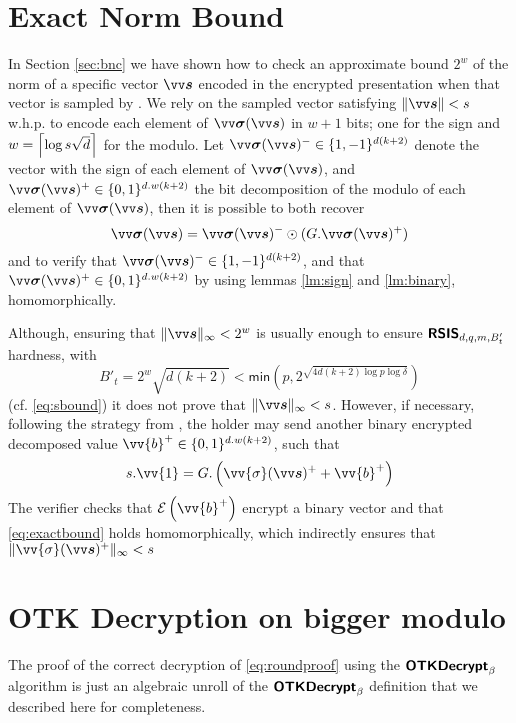 \section{Exact Norm Bound}\label{app:enb}

In Section \ref{sec:bnc} we have shown how to check an approximate bound $2^w$ of the norm of a specific vector $\pv{s}$ encoded in the encrypted presentation when that vector is sampled by . We rely on the sampled vector satisfying $\|\pv{s}\|<s$ w.h.p. to encode each element of $\pv{\sigma}(\pv{s})$ in $w+1$ bits; one for the sign and $w=\left\lceil \log s\sqrt{d} \right\rceil$ for the modulo. Let $\pv{\sigma}(\pv{s})^{-} \in \{1,-1\}^{d(k+2)}$ denote the vector with the sign of each element of $\pv{\sigma}(\pv{s})$, and $\pv{\sigma}(\pv{s})^{+} \in \{0,1\}^{d.w(k+2)}$ the bit decomposition of the modulo of each element of $\pv{\sigma}(\pv{s})$, then it is possible to both recover \[\pv{\sigma}(\pv{s}) = \pv{\sigma}(\pv{s})^{-} \odot (G.\pv{\sigma}(\pv{s})^{+})\]
and to verify that $\pv{\sigma}(\pv{s})^{-} \in \{1,-1\}^{d(k+2)}$, and that $\pv{\sigma}(\pv{s})^{+} \in \{0,1\}^{d.w(k+2)}$ by using lemmas \ref{lm:sign} and \ref{lm:binary}, homomorphically.

Although, ensuring that $\|\pv{s}\|_{\infty}<2^w$ is usually enough to ensure $\textsf{\textbf{RSIS}}_{d,q,m,B'_t}$ hardness, with 
\[B'_t=2^w\sqrt{d(k+2)} < \textsf{min}(p,2^{\sqrt{4d(k+2)\log{p}\log{\delta}}})\]
(cf. \cref{eq:sbound}) it does not prove that $\|\pv{s}\|_{\infty}<s$. However, if necessary, following the strategy from \cite{lyubashevskyLatticeBasedZeroKnowledgeProofs2022}, the holder may send another binary encrypted decomposed value $\vv{b}^{+} \in \{0,1\}^{d.w(k+2)}$, such that
\begin{equation}\label{eq:exactbound}
    s.\vv{1} = G.\left(\vv{\sigma}(\pv{s})^{+} + \vv{b}^{+}\right)
\end{equation}
The verifier checks that $\enc{\vv{b}^{+}}$ encrypt a binary vector and that \cref{eq:exactbound} holds homomorphically, which indirectly ensures that $\|\vv{\sigma}(\pv{s})^{+}\|_{\infty}<s$

\section{OTK Decryption on bigger modulo}\label{app:sotkdec}

The proof of the correct decryption of \cref{eq:roundproof} using the $\textsf{\textbf{OTKDecrypt}}_{\beta}$ algorithm is just an algebraic unroll of the $\textsf{\textbf{OTKDecrypt}}_{\beta}$ definition that we described here for completeness.


